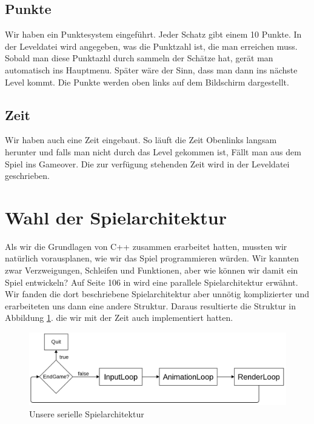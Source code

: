\documentclass[11pt,a4paper]{scrbook}
\begin{document}
\subsection{Punkte} 	
Wir haben ein Punktesystem eingeführt. Jeder Schatz gibt einem 10 Punkte. In der Leveldatei wird angegeben, was die Punktzahl ist, die man erreichen muss. Sobald man diese Punktazhl durch sammeln der Schätze hat, gerät man automatisch ins Hauptmenu. Später wäre der Sinn, dass man dann ins nächste Level kommt. Die Punkte werden oben links auf dem Bildschirm dargestellt. 	
 	
\subsection{Zeit} 	
Wir haben auch eine Zeit eingebaut. So läuft die Zeit Obenlinks langsam herunter und falls man nicht durch das Level gekommen ist, Fällt man aus dem Spiel ins Gameover. Die zur verfügung stehenden Zeit wird in der Leveldatei geschrieben.	
 	

\section{Wahl der Spielarchitektur}
Als wir die Grundlagen von C++ zusammen erarbeitet hatten, mussten wir natürlich vorausplanen, wie wir das Spiel programmieren würden.
Wir kannten zwar Verzweigungen, Schleifen und Funktionen, aber wie können wir damit ein Spiel entwickeln? Auf Seite 106 in \cite{sfml_gamedev} 
wird eine parallele Spielarchitektur erwähnt. Wir fanden die dort beschriebene Spielarchitektur aber unnötig komplizierter und erarbeiteten uns
dann eine andere Struktur. Daraus resultierte die Struktur in Abbildung \ref{fig:seriell}.
die wir mit der Zeit auch implementiert hatten.\\
\begin{figure}[h]
\centering
\includegraphics[scale=0.3]{img/gameloops.png}
\caption{Unsere serielle Spielarchitektur}
\label{fig:seriell}
\end{figure}
\end{document}
